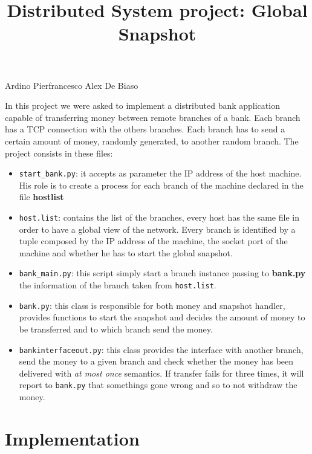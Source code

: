 \documentclass{article}
\begin{document}
\title{Distributed System project: Global Snapshot}
\maketitle
\begin{center}
Ardino Pierfrancesco Alex De Biaso\\

    \vspace{1cm}
\end{center}

In this project we were asked to implement a distributed bank application capable of transferring money between remote branches of a bank. Each branch has a TCP connection with the others branches. Each branch has to send a certain amount of money, randomly generated, to another random branch.
The project consists in these files:

\begin{itemize}
    \item \texttt{start\_bank.py}: it accepts as parameter the IP address of the host machine. His role is to create a process for each branch of the machine declared in the file \textbf{hostlist}
    \item \texttt{host.list}: contains the list of the branches, every host has the same file in order to have a global view of the network. Every branch is identified by a tuple composed by the IP address of the machine, the socket port of the machine and whether he has to start the global snapshot.
    \item \texttt{bank\_main.py}: this script simply start a branch instance passing to \textbf{bank.py} the information of the branch taken from \texttt{host.list}.
    \item \texttt{bank.py}: this class is responsible for both money and snapshot handler, provides functions to start the snapshot and decides the amount of money to be transferred and to which branch send the money.
    \item \texttt{bankinterfaceout.py}: this class provides the interface with another branch, send the money to a given branch and check whether the money has been delivered with \emph{at most once} semantics. If transfer fails for three times, it will report to \texttt{bank.py} that somethings gone wrong and so to not withdraw the money.
\end{itemize}
\section{Implementation}
\end{document}
